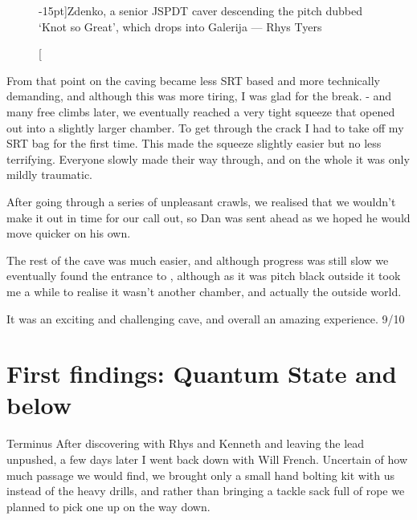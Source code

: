 \begin{figure}[t!]
\checkoddpage \ifoddpage \forcerectofloat \else \forceversofloat \fi
\centering
{}
\caption[][-15pt]{Zdenko, a senior JSPDT caver descending the pitch dubbed `Knot so Great', which drops into Galerija --- Rhys Tyers}
\label{Zdenko16}
\end{figure}
From that point on the caving became less SRT based and more technically demanding, and although this was more tiring, I was glad for the break. - and many free climbs later, we eventually reached a very tight squeeze that opened out into a slightly larger chamber. To get through the crack I had to take off my SRT bag for the first time. This made the squeeze slightly easier but no less terrifying. Everyone slowly made their way through, and on the whole it was only mildly traumatic.

After going through a series of unpleasant crawls, we realised that we wouldn't make it out in time for our call out, so Dan was sent ahead as we hoped he would move quicker on his own.

The rest of the cave was much easier, and although progress was still slow we eventually found the entrance to , although as it was pitch black outside it took me a while to realise it wasn't another chamber, and actually the outside world. 

It was an exciting and challenging cave, and overall an amazing experience. 9/10

\section{First findings: Quantum State and below}
Terminus
After discovering  with Rhys and Kenneth and leaving the lead unpushed, a few days later I went back down with Will French. 
Uncertain of how much passage we would find, we brought only a small hand bolting kit with us instead of the heavy drills, and rather than bringing a tackle sack full of rope we planned to pick one up on the way down. 

